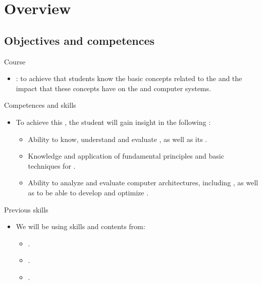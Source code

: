 \section{Overview}

\subsection{Objectives and competences}

\begin{frame}[t]{Course}
\begin{itemize}
  \item {}: to achieve that students know the basic concepts related
to the  and the impact that these concepts have on the
 and computer systems.

\end{itemize}
\end{frame}

\begin{frame}[t]{Competences and skills}
\begin{itemize}
  \item To achieve this , the student will gain insight in the following :
    \begin{itemize}
      \item Ability to know, understand and evaluate , as well as its .

      \item Knowledge and application of fundamental principles and basic techniques for .

      \item Ability to analyze and evaluate computer architectures, including , as well as to be able to develop and optimize .
    \end{itemize}
\end{itemize}
\end{frame}

\begin{frame}[t]{Previous skills}
\begin{itemize}
  \item We will be using skills and contents from:
    \begin{itemize}
      \item {}.
      \item {}.
      \item {}.
    \end{itemize}

\end{itemize}
\end{frame}


